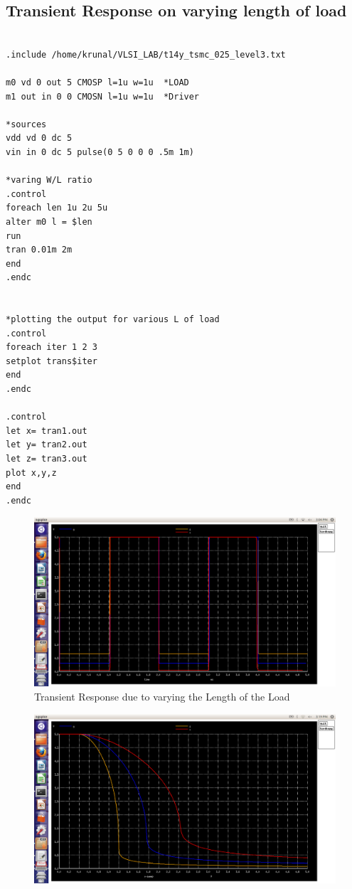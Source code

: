 \documentclass[12pt,a4paper]{article}
\begin{document}
\begin{center}
\subsection{Transient Response on varying length of load}
\begin{lstlisting}

.include /home/krunal/VLSI_LAB/t14y_tsmc_025_level3.txt

m0 vd 0 out 5 CMOSP l=1u w=1u  *LOAD 
m1 out in 0 0 CMOSN l=1u w=1u  *Driver

*sources
vdd vd 0 dc 5 
vin in 0 dc 5 pulse(0 5 0 0 0 .5m 1m)

*varing W/L ratio
.control
foreach len 1u 2u 5u
alter m0 l = $len
run 
tran 0.01m 2m
end
.endc


*plotting the output for various L of load
.control
foreach iter 1 2 3
setplot trans$iter
end
.endc

.control
let x= tran1.out
let y= tran2.out
let z= tran3.out
plot x,y,z
end
.endc

\end{lstlisting}

\begin{figure}[!ht]
\centering
\includegraphics[scale=0.37]{lab3_pic3_6_transient_dueto_varing_Lof_load.png}

\caption[Short]{Transient Response due to varying the Length of the Load}
\end{figure}

\begin{figure}[!ht]
\centering
\includegraphics[scale=0.37]{lab3_pic3_7_transfer_fun_dueto_varing_Lof_load.png}


\end{figure}
\end{center}
\end{document}
